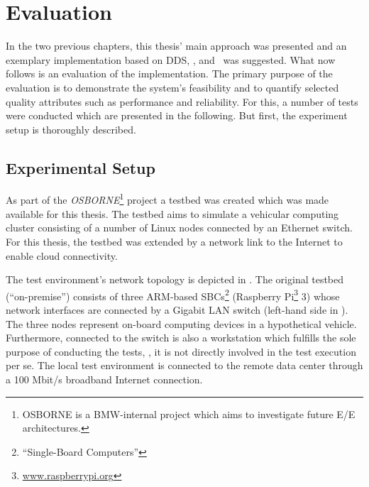 \chapter{Evaluation}\label{chapter:evaluation}
In the two previous chapters, this thesis' main approach was presented and an exemplary implementation based on DDS, \wnet , and \docker\ was suggested. What now follows is an evaluation of the implementation. The primary purpose of the evaluation is to demonstrate the system's feasibility and to quantify selected quality attributes such as performance and reliability. For this, a number of tests were conducted which are presented in the following. But first, the experiment setup is thoroughly described.


\section{Experimental Setup}\label{sec:testsetup}

As part of the \emph{OSBORNE}\footnote{OSBORNE is a BMW-internal project which aims to investigate future E/E architectures.} project a testbed was created which was made available for this thesis. The testbed aims to simulate a vehicular computing cluster consisting of a number of Linux nodes connected by an Ethernet switch. For this thesis, the testbed was extended by a network link to the Internet to enable cloud connectivity.

The test environment's network topology is depicted in . The original testbed (``on-premise'') consists of three ARM-based SBCs\footnote{``Single-Board Computers''} (Raspberry Pi\footnote{\url{www.raspberrypi.org}} 3) whose network interfaces are connected by a Gigabit LAN switch (left-hand side in ). The three nodes represent on-board computing devices in a hypothetical vehicle. Furthermore, connected to the switch is also a workstation which fulfills the sole purpose of conducting the tests, \ie , it is not directly involved in the test execution per se. The local test environment is connected to the remote data center through a 100 Mbit/s broadband Internet connection.

